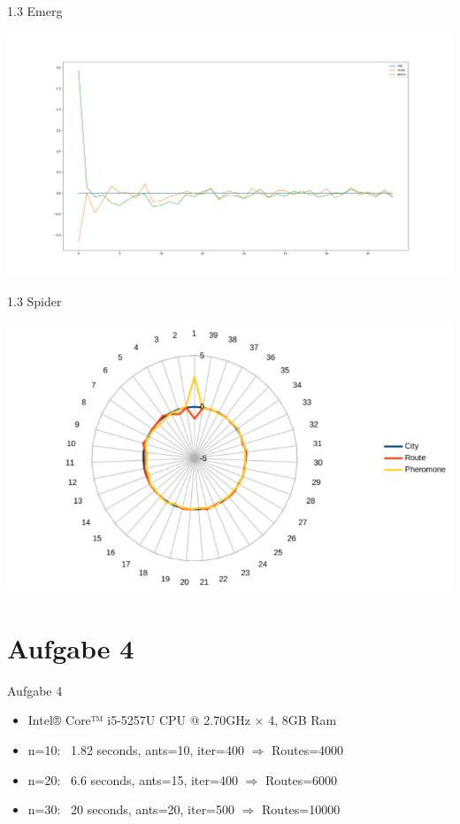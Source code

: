 \documentclass{ocbeameruni}
\begin{document}
\begin{frame}{1.3 Emerg}
    \begin{center}
    \includegraphics[scale=0.2]{Emerg_per_iter.png}
    \end{center}
\end{frame}

\begin{frame}{1.3 Spider}
    \begin{center}
    \includegraphics[scale=0.5]{spider_emerg.png}
    \end{center}
\end{frame}

\section{Aufgabe 4}

\begin{frame}{Aufgabe 4}
    \begin{itemize}
    \item Intel® Core™ i5-5257U CPU @ 2.70GHz × 4, 8GB Ram
    \item n=10: ~1.82 seconds, ants=10, iter=400 $\Rightarrow$ Routes=4000
    \item n=20: ~6.6 seconds, ants=15, iter=400 $\Rightarrow$ Routes=6000
    \item n=30: ~20 seconds, ants=20, iter=500 $\Rightarrow$ Routes=10000
    \end{itemize}
\end{frame}
\end{document}
